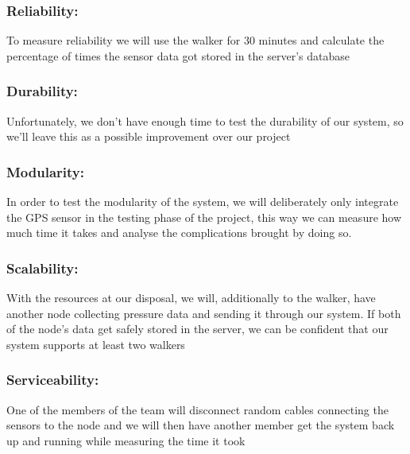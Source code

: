 \subsubsection{Reliability:}
To measure reliability we will use the walker for 30 minutes and calculate the percentage of times the sensor data got stored in the server’s database

\subsubsection{Durability:}
Unfortunately, we don’t have enough time to test the durability of our system, so we’ll leave this as a possible improvement over our project

\subsubsection{Modularity:}
In order to test the modularity of the system, we will deliberately only integrate the GPS sensor in the testing phase of the project, this way we can measure how much time it takes and analyse the complications brought by doing so.

\subsubsection{Scalability:}
With the resources at our disposal, we will, additionally to the walker, have another node collecting pressure data and sending it through our system. If both of the node’s data get safely stored in the server, we can be confident that our system supports at least two walkers

\subsubsection{Serviceability:}
One of the members of the team will disconnect random cables connecting the sensors to the node and we will then have another member get the system back up and running while measuring the time it took


